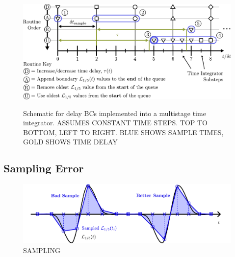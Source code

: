 \begin{figure}[t]
\centering
\includegraphics[scale=0.65]{assets/imgs/delay_bc_code_schematic.pdf}
\label{fig:schematic}
\caption{Schematic for delay BCs implemented into a multistage time integrator. ASSUMES CONSTANT TIME STEPS. TOP TO BOTTOM, LEFT TO RIGHT. BLUE SHOWS SAMPLE TIMES, GOLD SHOWS TIME DELAY}
\end{figure}



\subsection{Sampling Error}

\begin{figure}[t]
\centering
\includegraphics[scale=0.65]{assets/imgs/wave-sampling-comparison.pdf}
\caption{SAMPLING}
\label{fig:wave-sampling}
\end{figure}


